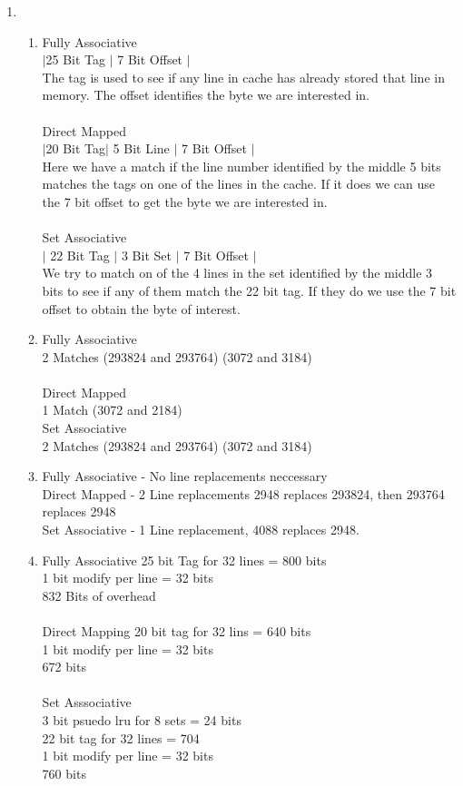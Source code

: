\documentclass[11pt,fleqn]{article}
\begin{document}
\begin{enumerate}
\begin{enumerate}
\end{enumerate}
\item %
\begin{enumerate}
\item 
Fully Associative \\
$|$25 Bit Tag $|$ 7 Bit Offset $|$ \\
The tag is used to see if any line in cache has already stored that line in memory. The offset identifies the byte we are interested in. \\
\\
Direct Mapped\\
$|$20 Bit Tag$|$ 5 Bit Line $|$ 7 Bit Offset $|$ \\
Here we have a match if the line number identified by the middle 5 bits matches the tags on one of the lines in the cache. If it does we can use the 7 bit offset to get the byte we are interested in. \\
\\
Set Associative \\
$|$ 22 Bit Tag $|$ 3 Bit Set $|$ 7 Bit Offset $|$ \\
We try to match on of the 4 lines in the set identified by the middle 3 bits 
to see if any of them match the 22 bit tag. If they do we use the 7 bit offset to obtain the byte of interest. 
\item 
Fully Associative \\
2 Matches (293824 and 293764) (3072 and 3184) \\
\\
Direct Mapped  \\
1 Match (3072 and 2184)
\\
Set Associative \\
2 Matches (293824 and 293764) (3072 and 3184)

\item
Fully Associative - No line replacements neccessary \\
Direct Mapped - 2 Line replacements 2948 replaces 293824, then 293764 replaces 2948 \\
Set Associative - 1 Line replacement, 4088 replaces 2948. \\

\item 
Fully Associative
25 bit Tag for 32 lines = 800 bits \\
1 bit modify per line = 32 bits \\
832 Bits of overhead \\
\\
Direct Mapping
20 bit tag for 32 lins = 640 bits \\
1 bit modify per line = 32 bits \\
672 bits \\
\\
Set Asssociative \\
3 bit psuedo lru for 8 sets = 24 bits \\
22 bit tag for 32 lines = 704 \\
1 bit modify per line = 32 bits \\
760 bits
\end{enumerate}
\end{enumerate}
\end{document}
